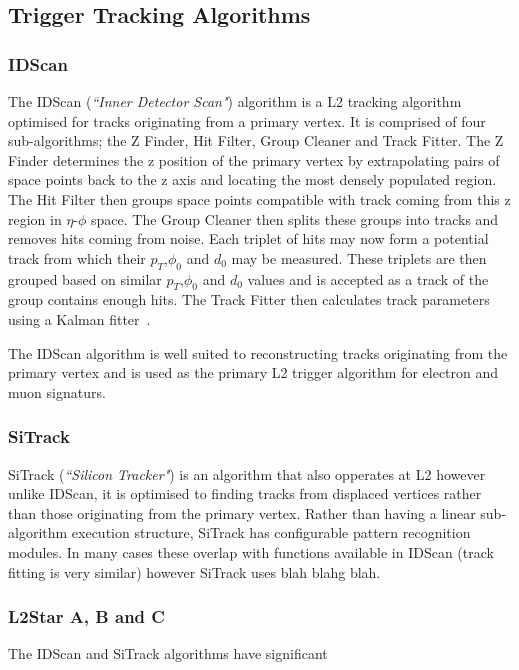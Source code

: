 \subsection{Trigger Tracking Algorithms}

\subsubsection*{IDScan}
The IDScan (\emph{``Inner Detector Scan"}) algorithm is a L2 tracking algorithm optimised for tracks originating from a primary vertex. It is comprised of four sub-algorithms; the Z Finder, Hit Filter, Group Cleaner and Track Fitter. The Z Finder determines the z position of the primary vertex by extrapolating pairs of space points back to the z axis and locating the most densely populated region. The Hit Filter then groups space points compatible with track coming from this z region in $\eta$-$\phi$ space. The Group Cleaner then splits these groups into tracks and removes hits coming from noise. Each triplet of hits may now form a potential track from which their $p_T$,$\phi_0$ and $d_0$ may be measured. These triplets are then grouped based on similar $p_T$,$\phi_0$ and $d_0$ values and is accepted as a track of the group contains enough hits. The Track Fitter then calculates track parameters using a Kalman fitter~\cite{Gaines:2000qc,Candlin:2001fa}. 

The IDScan algorithm is well suited to reconstructing tracks originating from the primary vertex and is used as the primary L2 trigger algorithm for electron and muon signaturs.

\subsubsection*{SiTrack}
SiTrack (\emph{``Silicon Tracker"}) is an algorithm that also opperates at L2 however unlike IDScan, it is optimised to finding tracks from displaced vertices rather than those originating from the primary vertex. Rather than having a linear sub-algorithm execution structure, SiTrack has configurable pattern recognition modules. In many cases these overlap with functions available in IDScan (track fitting is very similar) however SiTrack uses blah blahg blah.

\subsubsection*{L2Star A, B and C}
The IDScan and SiTrack algorithms have significant 

